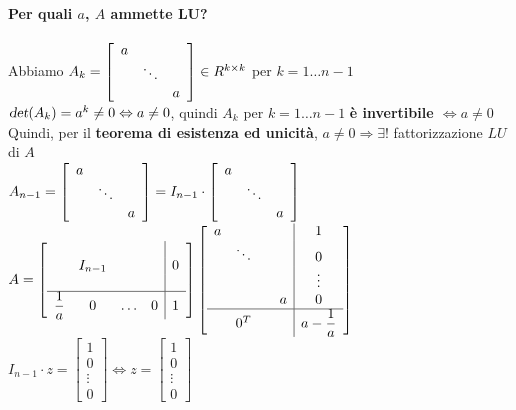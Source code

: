 \documentclass[10pt]{book}
\begin{document}
\paragraph{Per quali $a$, $A$ ammette LU?}  Abbiamo \begin{math}
A_k = \left[ \begin{array}{c c c}
	a & & \\
	& \ddots & \\
	& & a
\end{array} \right] \in R^{k \times k}
\end{math}
per $k = 1\ldots n-1$\\
$\textsl{det}(A_k) = a^k \neq 0 \Leftrightarrow a \neq 0$, quindi \textbf{$A_k$} per $k = 1\ldots n-1$ \textbf{è invertibile $\Leftrightarrow a \neq 0$}\\
Quindi, per il \textbf{teorema di esistenza ed unicità}, $a \neq 0 \Rightarrow \exists!$ fattorizzazione $LU$ di $A$\\
\begin{math}
A_{n-1} = \left[
\begin{array}{c c c}
	a & & \\
	& \ddots & \\
	& & a
\end{array}
\right] = I_{n-1} \cdot \left[
\begin{array}{c c c}
	a & & \\
	& \ddots & \\
	& & a
\end{array}
\right]
\end{math}\\
\begin{math}
A = \left[ 
\begin{array}{c c c c | c}
 & & & &\\
 & I_{n-1} & & & 0\\
 & & & &\\
 \hline
 \mathlarger{\frac{1}{a}} & 0 & \ldots & 0 & 1
\end{array}
\right] \left[
\begin{array}{c c c c | c}
 a & & & & 1\\
 & \ddots & & & 0\\
 & & & & \vdots \\
 & & & a & 0 \\
 \hline
 & 0^T & & & \mathlarger{a - \frac{1}{a}}
\end{array}
\right]
\end{math}\\
\begin{math}
I_{n-1} \cdot z = \left[ \begin{array}{c} 1\\0\\\vdots\\0\end{array} \right]
\Leftrightarrow
z = \left[ \begin{array}{c} 1\\0\\\vdots\\0\end{array} \right]
\end{math}\\
\end{document}
